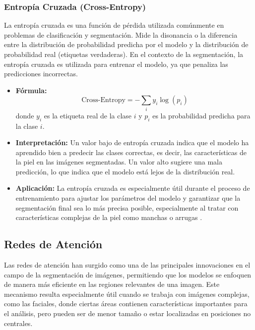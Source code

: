 \subsubsection{Entropía Cruzada (Cross-Entropy)}  
La entropía cruzada es una función de pérdida utilizada comúnmente en problemas de clasificación y segmentación. Mide la disonancia o la diferencia entre la distribución de probabilidad predicha por el modelo y la distribución de probabilidad real (etiquetas verdaderas). En el contexto de la segmentación, la entropía cruzada es utilizada para entrenar el modelo, ya que penaliza las predicciones incorrectas.  
\begin{itemize}
    \item \textbf{Fórmula:}  
    \[
    \text{Cross-Entropy} = -\sum_{i} y_i \log(p_i)
    \]
    donde \( y_i \) es la etiqueta real de la clase \( i \) y \( p_i \) es la probabilidad predicha para la clase \( i \).
    \item \textbf{Interpretación:} Un valor bajo de entropía cruzada indica que el modelo ha aprendido bien a predecir las clases correctas, es decir, las características de la piel en las imágenes segmentadas. Un valor alto sugiere una mala predicción, lo que indica que el modelo está lejos de la distribución real.
    \item \textbf{Aplicación:} La entropía cruzada es especialmente útil durante el proceso de entrenamiento para ajustar los parámetros del modelo y garantizar que la segmentación final sea lo más precisa posible, especialmente al tratar con características complejas de la piel como manchas o arrugas \cite{autor2022crossentropy}.
\end{itemize}
\subsection{Redes de Atención}  
Las redes de atención han surgido como una de las principales innovaciones en el campo de la segmentación de imágenes, permitiendo que los modelos se enfoquen de manera más eficiente en las regiones relevantes de una imagen. Este mecanismo resulta especialmente útil cuando se trabaja con imágenes complejas, como las faciales, donde ciertas áreas contienen características importantes para el análisis, pero pueden ser de menor tamaño o estar localizadas en posiciones no centrales.

